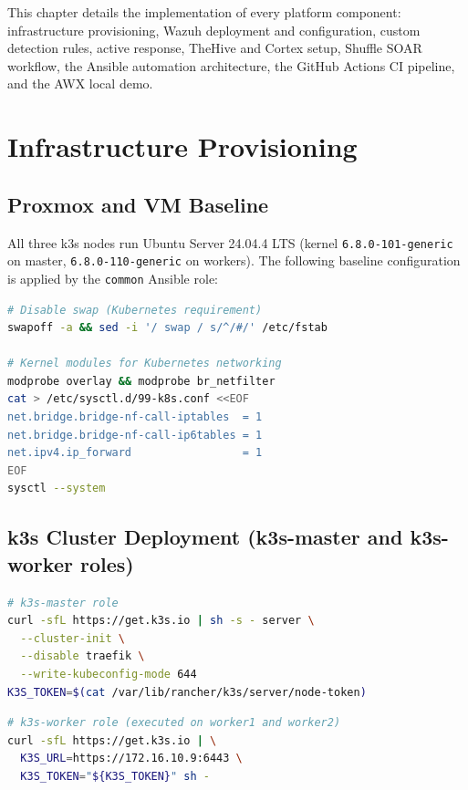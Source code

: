 \documentclass[12pt,a4paper]{report}
\begin{document}
This chapter details the implementation of every platform component: infrastructure provisioning, Wazuh deployment and configuration, custom detection rules, active response, TheHive and Cortex setup, Shuffle SOAR workflow, the Ansible automation architecture, the GitHub Actions CI pipeline, and the AWX local demo.

\section{Infrastructure Provisioning}

\subsection{Proxmox and VM Baseline}

All three k3s nodes run Ubuntu Server 24.04.4 LTS (kernel \texttt{6.8.0-101-generic} on master, \texttt{6.8.0-110-generic} on workers). The following baseline configuration is applied by the \texttt{common} Ansible role:

\begin{lstlisting}[language=bash, caption=Baseline node configuration (common role)]
# Disable swap (Kubernetes requirement)
swapoff -a && sed -i '/ swap / s/^/#/' /etc/fstab

# Kernel modules for Kubernetes networking
modprobe overlay && modprobe br_netfilter
cat > /etc/sysctl.d/99-k8s.conf <<EOF
net.bridge.bridge-nf-call-iptables  = 1
net.bridge.bridge-nf-call-ip6tables = 1
net.ipv4.ip_forward                 = 1
EOF
sysctl --system
\end{lstlisting}

\subsection{k3s Cluster Deployment (k3s-master and k3s-worker roles)}

\begin{lstlisting}[language=bash, caption=k3s master installation]
# k3s-master role
curl -sfL https://get.k3s.io | sh -s - server \
  --cluster-init \
  --disable traefik \
  --write-kubeconfig-mode 644
K3S_TOKEN=$(cat /var/lib/rancher/k3s/server/node-token)
\end{lstlisting}

\begin{lstlisting}[language=bash, caption=k3s worker join]
# k3s-worker role (executed on worker1 and worker2)
curl -sfL https://get.k3s.io | \
  K3S_URL=https://172.16.10.9:6443 \
  K3S_TOKEN="${K3S_TOKEN}" sh -
\end{lstlisting}
\end{document}
